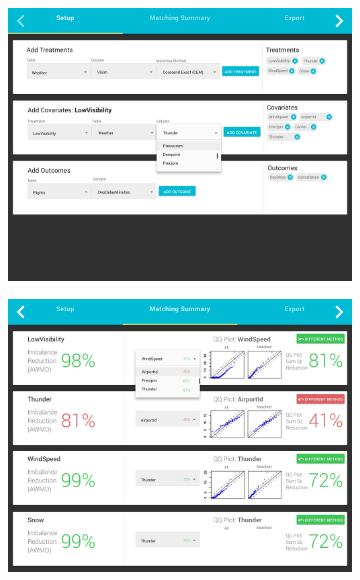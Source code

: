 \begin{figure}[t]
  \begin{subfigure}{0.33\linewidth}
    \centering
    \hspace{-.6cm}
    \includegraphics[scale=0.13]{Figures/Setup.png}
    \caption{\scriptsize }
    \label{sfig:testaa}
  \end{subfigure}\hfill
  \begin{subfigure}{0.33\linewidth}
    \centering
    \hspace{-.6cm}
    \includegraphics[scale=0.13]{Figures/Matching-Summary.png}
    \caption{\scriptsize }
    \label{sfig:testbb}

\end{subfigure}
\end{figure}
